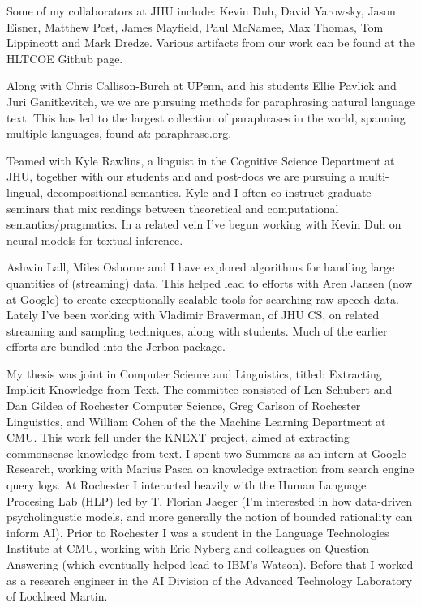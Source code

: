 Some of my collaborators at JHU include: Kevin Duh, David Yarowsky, Jason Eisner, Matthew Post,
James Mayfield, Paul McNamee, Max Thomas, Tom Lippincott and Mark Dredze. Various artifacts
from our work can be found at the HLTCOE Github page. 

Along with Chris Callison-Burch at UPenn, and his students Ellie Pavlick and Juri Ganitkevitch,
we we are pursuing methods for paraphrasing natural language text. This has led to the largest 
collection of paraphrases in the world, spanning multiple languages, found at: paraphrase.org. 

Teamed with Kyle Rawlins, a linguist in the Cognitive Science Department at JHU, together with our
students and and post-docs we are pursuing a multi-lingual, decompositional semantics. Kyle and I often co-instruct 
graduate seminars that mix readings between theoretical and computational semantics/pragmatics. In a related vein
I've begun working with Kevin Duh on neural models for textual inference. 

Ashwin Lall, Miles Osborne and I have explored algorithms for handling large quantities of (streaming) data.
This helped lead to efforts with Aren Jansen (now at Google) to create exceptionally scalable 
tools for searching raw speech data. Lately I've been working with Vladimir Braverman, of JHU CS, on related
streaming and sampling techniques, along with students. Much of the earlier efforts are bundled into the Jerboa package. 

My thesis was joint in Computer Science and Linguistics, titled: Extracting Implicit Knowledge from Text. The committee consisted of Len Schubert and Dan Gildea of Rochester Computer Science, Greg Carlson of Rochester Linguistics, and William Cohen of the the Machine Learning Department at CMU. This work fell under the KNEXT project, aimed at extracting commonsense knowledge from text. I spent two Summers as an intern at Google Research, working with Marius Pasca on knowledge extraction from search engine query logs. At Rochester I interacted heavily with the Human Language Procesing Lab (HLP) led by T. Florian Jaeger (I'm interested in how data-driven psycholingustic models, and more generally the notion of bounded rationality can inform AI). Prior to Rochester I was a student in the Language Technologies Institute at CMU, working with Eric Nyberg and 
colleagues on Question Answering (which eventually helped lead to IBM's Watson). Before that I worked as a
research engineer in the AI Division of the Advanced Technology Laboratory of Lockheed Martin. 
